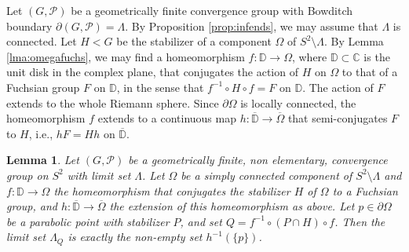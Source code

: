 \documentclass[11pt]{article}
\newtheorem{lemma}[theorem]{Lemma}
\theoremstyle{definition}
\newcommand\PP{\mathcal{P}}
\begin{document}
 Let $(G, \mathcal{P})$ be a geometrically finite convergence group with Bowditch boundary $\partial(G, \PP) = \Lambda$. By Proposition \ref{prop:infends}, we may assume that $\Lambda$ is connected.  Let $H<G$ be the stabilizer of a component $\Omega$ of $S^2\setminus \Lambda$. By  Lemma \ref{lma:omegafuchs}, we may find a homeomorphism $f:\mathbb{D}\to \Omega$, where $\mathbb{D}\subset \mathbb{C}$ is the unit disk in the complex plane, that conjugates the action of $H$ on $\Omega$ to that of a Fuchsian group $F$ on  $\mathbb{D}$, in the sense that 
 $f^{-1}\circ H\circ f=F$ on $\mathbb{D}$. The action of $F$ extends to the whole Riemann sphere. Since $\partial\Omega$ is locally connected, the homeomorphism $f$ extends to a continuous map $h:\overline{\mathbb{D}}\to \overline{\Omega}$ that semi-conjugates $F$ to
$H$, i.e., $hF={H h}$ on $\overline{\mathbb{D}}$.


\begin{lemma}\label{lma:parabolicvsfuchs}  Let $(G, \PP)$ be a geometrically finite, non elementary, convergence group on $S^2$ with limit set $\Lambda$.  Let $\Omega$ be a simply connected component of $S^2 \setminus \Lambda$ and {$f:\mathbb{D}\to \Omega$ the homeomorphism that conjugates the stabilizer $H$ of $\Omega$} to a Fuchsian group, and $h:\overline{\mathbb{D}}\to\overline{\Omega}$ the extension of this homeomorphism as above. Let $p\in\partial\Omega$ be a parabolic point with stabilizer $P$, and set {$Q= f^{-1}\circ(P\cap H)\circ f$}. 
Then the limit set $\Lambda_Q$ is exactly the non-empty set  $h^{-1}(\{p\})$.
\end{lemma}
\end{document}
